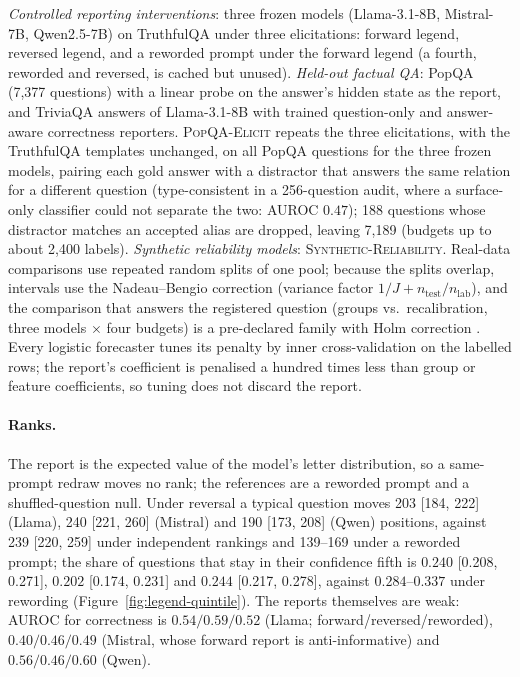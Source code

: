 \documentclass[twoside]{article}
\theoremstyle{definition}
\theoremstyle{remark}
\newcommand{\1}{\mathbf{1}}
\newcommand{\expname}[1]{\textsc{#1}}
\begin{document}
\emph{Controlled reporting interventions}: three frozen models
(Llama-3.1-8B, Mistral-7B, Qwen2.5-7B) on TruthfulQA under three elicitations: forward legend,
reversed legend, and a reworded prompt under the forward legend (a fourth, reworded and reversed, is
cached but unused). \emph{Held-out factual QA}: PopQA \citep{mallen2023popqa} (7{,}377 questions) with a linear probe on the
answer's hidden state as the report, and TriviaQA \citep{joshi2017triviaqa} answers of Llama-3.1-8B with trained question-only
and answer-aware correctness reporters. \expname{PopQA-Elicit} repeats the three elicitations, with the
TruthfulQA templates unchanged, on all PopQA questions for the three frozen models, pairing each gold
answer with a distractor that answers the same relation for a different question (type-consistent in
a 256-question audit, where a surface-only classifier could not separate the two: AUROC $0.47$); 188 questions whose distractor matches an accepted alias are
dropped, leaving 7{,}189 (budgets up to about 2{,}400 labels). \emph{Synthetic reliability models}: \expname{Synthetic-Reliability}. Real-data comparisons
use repeated random splits of one pool; because the splits overlap, intervals use the Nadeau--Bengio
correction \citep{nadeau2003inference} (variance factor $1/J+n_{\mathrm{test}}/n_{\mathrm{lab}}$), and the comparison that answers the
registered question (groups vs.\ recalibration, three models $\times$ four budgets) is a pre-declared
family with Holm correction \citep{holm1979simple}. Every logistic forecaster tunes its penalty by inner cross-validation on
the labelled rows; the report's coefficient is penalised a hundred times less than group or feature
coefficients, so tuning does not discard the report.

\paragraph{Ranks.} The report is the expected value of the model's letter distribution, so a
same-prompt redraw moves no rank; the references are a reworded prompt and a shuffled-question null.
Under reversal a typical question moves 203 [184, 222] (Llama), 240 [221, 260] (Mistral) and 190
[173, 208] (Qwen) positions, against 239 [220, 259] under independent rankings and 139--169 under a
reworded prompt; the share of questions that stay in their confidence fifth is $0.240$ [0.208, 0.271],
$0.202$ [0.174, 0.231] and $0.244$ [0.217, 0.278], against $0.284$--$0.337$ under rewording
(Figure~\ref{fig:legend-quintile}). The reports themselves are weak: AUROC for correctness is
$0.54/0.59/0.52$ (Llama; forward/reversed/reworded), $0.40/0.46/0.49$ (Mistral, whose forward report
is anti-informative) and $0.56/0.46/0.60$ (Qwen).
\end{document}
